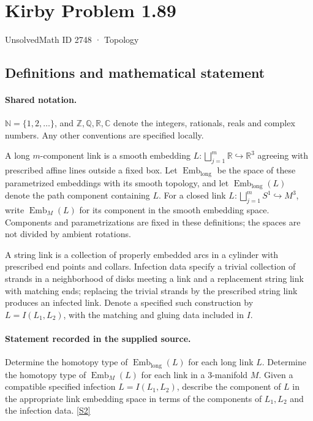\documentclass[11pt]{article}
\newcommand{\sref}[2]{\hyperlink{source:#1:#2}{[S#2]}}
\begin{document}
\setcounter{section}{2747}
\section{Kirby Problem 1.89}\label{2748}
{\small\sffamily UnsolvedMath ID 2748 · Topology}
\subsection{Definitions and mathematical statement}

\paragraph{Shared notation.}$\mathbb N=\{1,2,\ldots\}$, and $\mathbb Z,\mathbb Q,\mathbb R,\mathbb C$ denote the integers, rationals, reals and complex numbers. Any other conventions are specified locally.


A long $m$-component link is a smooth embedding $L:\bigsqcup_{j=1}^m\mathbb R\hookrightarrow\mathbb R^3$ agreeing with prescribed affine lines outside a fixed box. Let $\operatorname{Emb}_{\mathrm{long}}$ be the space of these parametrized embeddings with its smooth topology, and let $\operatorname{Emb}_{\mathrm{long}}(L)$ denote the path component containing $L$. For a closed link $L:\bigsqcup_{j=1}^m S^1\hookrightarrow M^3$, write $\operatorname{Emb}_M(L)$ for its component in the smooth embedding space. Components and parametrizations are fixed in these definitions; the spaces are not divided by ambient rotations.

A string link is a collection of properly embedded arcs in a cylinder with prescribed end points and collars. Infection data specify a trivial collection of strands in a neighborhood of disks meeting a link and a replacement string link with matching ends; replacing the trivial strands by the prescribed string link produces an infected link. Denote a specified such construction by $L=I(L_1,L_2)$, with the matching and gluing data included in $I$.
\paragraph{Statement recorded in the supplied source.}
Determine the homotopy type of $\operatorname{Emb}_{\mathrm{long}}(L)$ for each long link $L$. Determine the homotopy type of $\operatorname{Emb}_M(L)$ for each link in a 3-manifold $M$. Given a compatible specified infection $L=I(L_1,L_2)$, describe the component of $L$ in the appropriate link embedding space in terms of the components of $L_1,L_2$ and the infection data. \sref{2748}{2}
\end{document}
